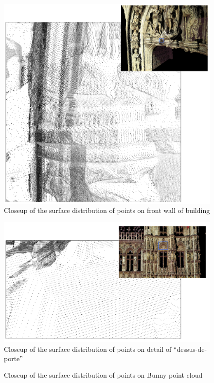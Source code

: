 \begin{figure}[p]
\centering
\includegraphics[width=.6\textwidth]{fig/closeup_ddp.png}
\caption{Closeup of the surface distribution of points on front wall of building}
\label{fig:closeup_ddp}
\end{figure}

\begin{figure}[p]
\centering
\includegraphics[width=.6\textwidth]{fig/closeup_wall.png}
\caption{Closeup of the surface distribution of points on detail of ``dessus-de-porte''}
\label{fig:closeup_wall}
\end{figure}

\begin{figure}[p]
\centering
{
	\setlength{\fboxsep}{0pt}%
	\setlength{\fboxrule}{0.5pt}%
}
\caption{Closeup of the surface distribution of points on Bunny point cloud}
\label{fig:bunny_grid_closeup}
\end{figure}

